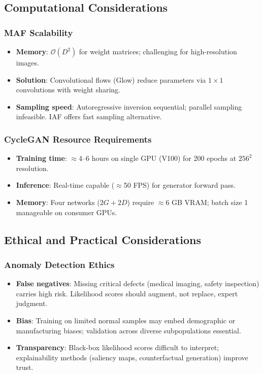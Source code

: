 \documentclass[11pt]{article}
\begin{document}
\subsection{Computational Considerations}
\subsubsection{MAF Scalability}
\begin{itemize}
\item \textbf{Memory}: $\mathcal{O}(D^2)$ for weight matrices; challenging for high-resolution images.
\item \textbf{Solution}: Convolutional flows (Glow) reduce parameters via $1 \times 1$ convolutions with weight sharing.
\item \textbf{Sampling speed}: Autoregressive inversion sequential; parallel sampling infeasible. IAF offers fast sampling alternative.
\end{itemize}

\subsubsection{CycleGAN Resource Requirements}
\begin{itemize}
\item \textbf{Training time}: $\approx$4–6 hours on single GPU (V100) for 200 epochs at $256^2$ resolution.
\item \textbf{Inference}: Real-time capable ($\approx$50 FPS) for generator forward pass.
\item \textbf{Memory}: Four networks ($2G + 2D$) require $\approx$6 GB VRAM; batch size 1 manageable on consumer GPUs.
\end{itemize}

\subsection{Ethical and Practical Considerations}
\subsubsection{Anomaly Detection Ethics}
\begin{itemize}
\item \textbf{False negatives}: Missing critical defects (medical imaging, safety inspection) carries high risk. Likelihood scores should augment, not replace, expert judgment.
\item \textbf{Bias}: Training on limited normal samples may embed demographic or manufacturing biases; validation across diverse subpopulations essential.
\item \textbf{Transparency}: Black-box likelihood scores difficult to interpret; explainability methods (saliency maps, counterfactual generation) improve trust.
\end{itemize}
\end{document}
